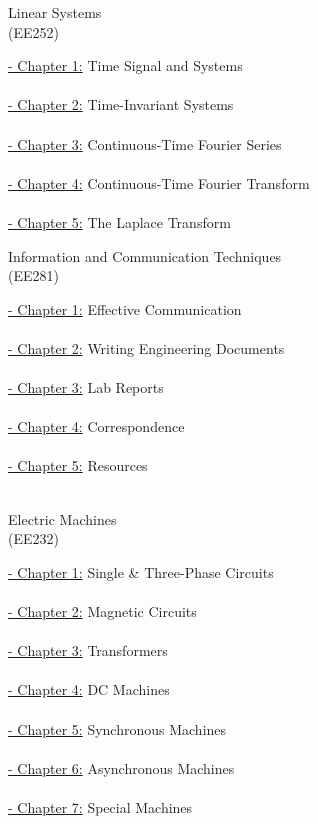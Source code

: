 \documentclass[12pt, a4paper]{article}
\begin{document}
\newpage 
\begin{center}
\Huge 
Linear Systems \\ (EE252) 
\end{center}
\normalsize
\large \underline{- Chapter 1:} Time Signal and Systems\\ \\
\large \underline{- Chapter 2:} Time-Invariant Systems\\ \\ 
\large \underline{- Chapter 3:} Continuous-Time Fourier Series\\ \\ 
\large \underline{- Chapter 4:} Continuous-Time Fourier Transform\\ \\ 
\large \underline{- Chapter 5:} The Laplace Transform


\newpage 
\begin{center}
\Huge 
Information and Communication Techniques \\ (EE281)
\end{center}
\normalsize
\large \underline{- Chapter 1:} Effective Communication\\ \\
\large \underline{- Chapter 2:} Writing Engineering Documents\\ \\
\large \underline{- Chapter 3:} Lab Reports\\ \\
\large \underline{- Chapter 4:} Correspondence\\ \\
\large \underline{- Chapter 5:} Resources\\ \\


\newpage 
\begin{center}
\Huge 
Electric Machines \\ (EE232)
\end{center}
\normalsize
\large \underline{- Chapter 1:} Single \& Three-Phase Circuits\\ \\
\large \underline{- Chapter 2:} Magnetic Circuits\\ \\
\large \underline{- Chapter 3:} Transformers\\ \\
\large \underline{- Chapter 4:} DC Machines\\ \\
\large \underline{- Chapter 5:} Synchronous Machines\\ \\
\large \underline{- Chapter 6:} Asynchronous Machines\\ \\
\large \underline{- Chapter 7:} Special Machines\\ \\
\end{document}
